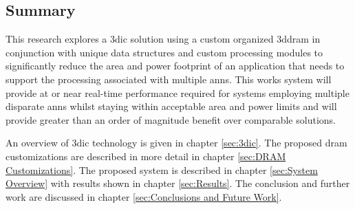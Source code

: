 \subsection[Summary]{Summary}
\label{sec:Summary}

This research explores a \ac{3dic} solution using a custom organized \ac{3ddram} in conjunction with unique data structures and custom processing modules to significantly reduce the 
area and power footprint of an application that needs to support the processing associated with multiple \ac{ann}s.
This works system will provide at or near real-time performance required for systems employing multiple disparate \ac{ann}s whilst staying within acceptable area and power limits and will provide greater than an order of magnitude benefit over comparable solutions.

An overview of \ac{3dic} technology is given in chapter \ref{sec:3dic}.
The proposed \ac{dram} customizations are described in more detail in chapter \ref{sec:DRAM Customizations}.
The proposed system is described in chapter \ref{sec:System Overview} with results shown in chapter \ref{sec:Results}.
The conclusion and further work are discussed in chapter \ref{sec:Conclusions and Future Work}.
